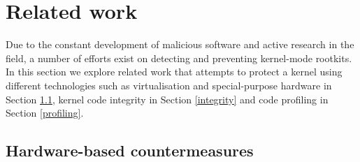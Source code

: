\section{Related work}\label{hr:related}
Due to the constant development of malicious software and active research in the field, a number of efforts exist on detecting and preventing kernel-mode rootkits. 
In this section we explore related work that attempts to protect a kernel using different technologies such as virtualisation and special-purpose hardware in Section \ref{hardware}, kernel code integrity in Section \ref{integrity} and code profiling in Section \ref{profiling}.


\subsection{Hardware-based countermeasures} \label{hardware}
